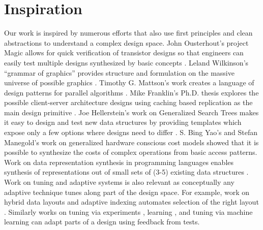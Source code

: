 \documentclass[11pt]{article}
\begin{document}
\section{Inspiration}
Our work is inspired by numerous efforts that also use first principles and clean abstractions to understand a complex design space. John Ousterhout's project Magic allows for quick verification of transistor designs so that engineers can easily test multiple designs synthesized by basic concepts \cite{Ousterhout1984}. Leland Wilkinson's ``grammar of graphics'' provides structure and formulation on the massive universe of possible graphics \cite{Wilkinson2005}. Timothy G. Mattson's work creates a language of design patterns for parallel algorithms \cite{Mattson2004}. Mike Franklin's Ph.D. thesis explores the possible client-server architecture designs using caching based replication as the main design primitive \cite{Franklin1993}. 
Joe Hellerstein's work on Generalized Search Trees makes it easy to design and test new data structures by providing templates which expose only a few options where designs need to differ \cite{Hellerstein1995,Aoki1998,Aoki1999,Kornacker1997,Kornacker1999,Kornacker1998,Kornacker2003}. 
S. Bing Yao's \cite{Yao1977} and 
Stefan Manegold's \cite{Manegold2002} work on generalized hardware conscious cost models showed that it is possible to synthesize the costs of complex operations from basic access patterns. 
Work on data representation synthesis in programming languages enables synthesis of representations out of small sets of (3-5) existing data structures \cite{Schonberg1979,Schonberg1981,Cohen1993,Smaragdakis1997,Shacham2009,Hawkins2011,Hawkins2012,Loncaric2016,Steindorfer2016}. 
Work on tuning \cite{Ioannidis1987, Chaudhuri1997} and adaptive systems is also relevant as conceptually any adaptive technique tunes along part of the design space. For example, work on hybrid data layouts and adaptive indexing automates selection of the right layout \cite{Arulraj2016,Alagiannis2014, Hankins2003,Idreos2007,Dittrich2011,Schuhknecht2013,Alvarez2014, Liu2016, Dayan2017, Pirk2014, Graefe2012a,Petraki2015,Zoumpatianos2014,Idreos2009, Kennedy2015,Sleator1985}. Similarly works on tuning via experiments \cite{Babu2009}, learning \cite{Anderson2013}, and tuning via machine learning \cite{Aken2017,Heimel2015} can adapt parts of a design using feedback from tests.
\end{document}
